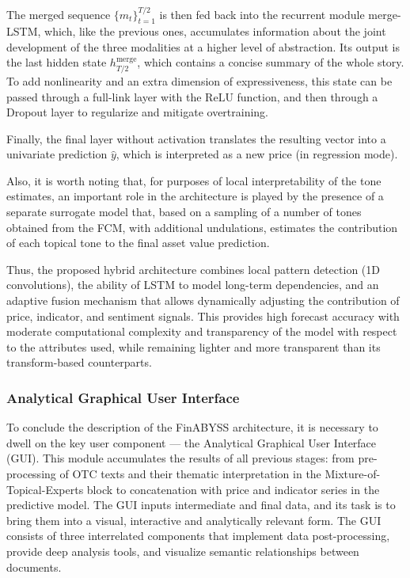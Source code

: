 The merged sequence $\{m_t\}_{t=1}^{T/2}$ is then fed back into the recurrent module merge-LSTM, which, like
the previous ones, accumulates information about the joint development of the three modalities at a higher
level of abstraction. Its output is the last hidden state $h_{T/2}^{\mathrm{merge}}$, which contains
a concise summary of the whole story. To add nonlinearity and an extra dimension of expressiveness, this
state can be passed through a full-link layer with the $\mathrm{ReLU}$ function, and then through a Dropout
layer to regularize and mitigate overtraining.

Finally, the final layer without activation translates the resulting vector into a univariate prediction
$\hat y$, which is interpreted as a new price (in regression mode).

Also, it is worth noting that, for purposes of local interpretability of the tone estimates, an important
role in the architecture is played by the presence of a separate surrogate model that, based on a sampling
of a number of tones obtained from the FCM, with additional undulations, estimates the contribution
of each topical tone to the final asset value prediction.

Thus, the proposed hybrid architecture combines local pattern detection (1D convolutions), the ability
of LSTM to model long-term dependencies, and an adaptive fusion mechanism that allows dynamically adjusting
the contribution of price, indicator, and sentiment signals. This provides high forecast accuracy with moderate
computational complexity and transparency of the model with respect to the attributes used, while remaining
lighter and more transparent than its transform-based counterparts.

\subsubsection{Analytical Graphical User Interface}
\label{sec:gui}
To conclude the description of the FinABYSS architecture, it is necessary to dwell on the key user
component --- the Analytical Graphical User Interface (GUI). This module accumulates the results
of all previous stages: from pre-processing of OTC texts and their thematic interpretation in
the Mixture-of-Topical-Experts block to concatenation with price and indicator series in the predictive
model. The GUI inputs intermediate and final data, and its task is to bring them into a visual, interactive
and analytically relevant form. The GUI consists of three interrelated components that implement data
post-processing, provide deep analysis tools, and visualize semantic relationships between documents.

